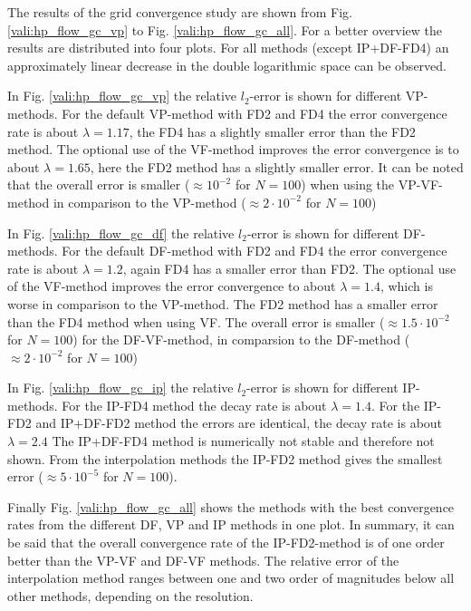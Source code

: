 The results of the grid convergence study are shown from Fig. \ref{vali:hp_flow_gc_vp} to Fig. \ref{vali:hp_flow_gc_all}.
For a better overview the results are distributed into four plots.
For all methods (except IP+DF-FD4) an approximately linear decrease in the double logarithmic space can be observed.

In Fig. \ref{vali:hp_flow_gc_vp} the relative $l_2$-error is shown for different VP-methods.
For the default VP-method with FD2 and FD4 the error convergence rate is about $\lambda=1.17$,
the FD4 has a slightly smaller error than the FD2 method.
The optional use of the VF-method improves the error convergence is to about $\lambda=1.65$,
here the FD2 method has a slightly smaller error.
It can be noted that the overall error is smaller ($\approx 10^{-2}$ for $N=100$)
when using the VP-VF-method in comparison to the VP-method ($\approx2\cdot 10^{-2}$ for $N=100$)

In Fig. \ref{vali:hp_flow_gc_df} the relative $l_2$-error is shown for different DF-methods.
For the default DF-method with FD2 and FD4 the error convergence rate is about $\lambda=1.2$,
again FD4 has a smaller error than FD2.
The optional use of the VF-method improves the error convergence to about $\lambda=1.4$,
which is worse in comparison to the VP-method. The FD2 method has a smaller error than the FD4 method when using VF.
The overall error is smaller ($\approx 1.5 \cdot 10^{-2}$ for $N=100$) for the DF-VF-method,
in comparsion to the DF-method ($\approx2\cdot 10^{-2}$ for $N=100$)

In Fig. \ref{vali:hp_flow_gc_ip} the relative $l_2$-error is shown for different IP-methods.
For the IP-FD4 method the decay rate is about $\lambda=1.4$.
For the IP-FD2 and IP+DF-FD2 method the errors are identical, the decay rate is about $\lambda=2.4$
The IP+DF-FD4 method is numerically not stable and therefore not shown.
From the interpolation methods the IP-FD2 method gives the smallest error  ($\approx 5 \cdot 10^{-5}$ for $N=100$).

Finally Fig. \ref{vali:hp_flow_gc_all} shows the methods  with the best convergence
rates from the different DF, VP and IP methods in one plot.
In summary, it can be said that the overall convergence rate of the IP-FD2-method is of one order better
than the VP-VF and DF-VF methods. The relative error of the interpolation method ranges
between one and two order of magnitudes below all other methods, depending on the resolution.

